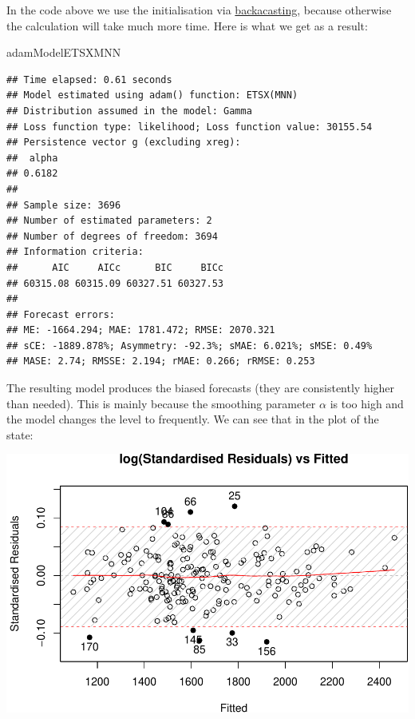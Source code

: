 \documentclass[
]{book}
\newenvironment{Shaded}{\begin{snugshade}}{\end{snugshade}}
\newcommand{\AttributeTok}[1]{\textcolor[rgb]{0.77,0.63,0.00}{#1}}
\newcommand{\DecValTok}[1]{\textcolor[rgb]{0.00,0.00,0.81}{#1}}
\newcommand{\FunctionTok}[1]{\textcolor[rgb]{0.00,0.00,0.00}{#1}}
\newcommand{\NormalTok}[1]{#1}
\newcommand{\SpecialCharTok}[1]{\textcolor[rgb]{0.00,0.00,0.00}{#1}}
\newcommand{\StringTok}[1]{\textcolor[rgb]{0.31,0.60,0.02}{#1}}
\theoremstyle{definition}
\theoremstyle{definition}
\theoremstyle{definition}
\theoremstyle{definition}
\theoremstyle{remark}
\begin{document}
In the code above we use the initialisation via \protect\hyperlink{ADAMInitialisationOptAndBack}{backacasting}, because otherwise the calculation will take much more time. Here is what we get as a result:

\begin{Shaded}
\begin{Highlighting}[]
\NormalTok{adamModelETSXMNN}
\end{Highlighting}
\end{Shaded}

\begin{verbatim}
## Time elapsed: 0.61 seconds
## Model estimated using adam() function: ETSX(MNN)
## Distribution assumed in the model: Gamma
## Loss function type: likelihood; Loss function value: 30155.54
## Persistence vector g (excluding xreg):
##  alpha 
## 0.6182 
## 
## Sample size: 3696
## Number of estimated parameters: 2
## Number of degrees of freedom: 3694
## Information criteria:
##      AIC     AICc      BIC     BICc 
## 60315.08 60315.09 60327.51 60327.53 
## 
## Forecast errors:
## ME: -1664.294; MAE: 1781.472; RMSE: 2070.321
## sCE: -1889.878%; Asymmetry: -92.3%; sMAE: 6.021%; sMSE: 0.49%
## MASE: 2.74; RMSSE: 2.194; rMAE: 0.266; rRMSE: 0.253
\end{verbatim}

The resulting model produces the biased forecasts (they are consistently higher than needed). This is mainly because the smoothing parameter \(\alpha\) is too high and the model changes the level to frequently. We can see that in the plot of the state:

\begin{Shaded}
\end{Shaded}

\includegraphics{adam_files/figure-latex/unnamed-chunk-112-1.pdf}
\end{document}
